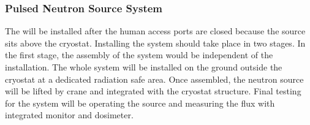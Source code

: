 \subsubsection{Pulsed Neutron Source System} 
The  will be installed after the human access ports are closed because the source sits above the cryostat. Installing the system should take place in two stages. In the first stage, the assembly of the system would be independent of the  installation. The whole system will be installed on the ground outside the cryostat at a dedicated radiation safe area. Once assembled, the neutron source will be lifted by crane and integrated with the cryostat structure. Final  testing for the system will be operating the source and measuring the flux with integrated monitor and dosimeter.



